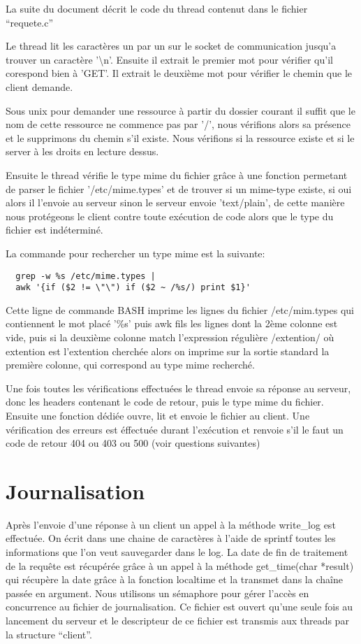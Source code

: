 \documentclass{article}
\begin{document}
La suite du document décrit le code du thread contenut dans le fichier ``requete.c''

Le thread lit les caractères un par un sur le socket de communication jusqu'a trouver un caractère '\textbackslash{}n'.
Ensuite il extrait le premier mot pour vérifier qu'il corespond bien à 'GET'.
Il extrait le deuxième mot pour vérifier le chemin que le client demande.

Sous unix pour demander une ressource à partir du dossier courant il suffit que le nom de cette ressource ne commence pas par '/', nous vérifions alors sa présence et le
supprimons du chemin s'il existe. Nous vérifions si la ressource existe et si le server à les droits en lecture dessus.\hbox{}

Ensuite le thread vérifie le type mime du fichier grâce à une fonction permetant de parser le fichier '/etc/mime.types' et de trouver si un mime-type existe, si oui alors
il l'envoie au serveur sinon le serveur envoie 'text/plain', de cette manière nous protégeons le client contre toute exécution de code alors que le type du fichier est indéterminé.\hbox{}

La commande pour rechercher un type mime est la suivante: \hbox{}
\begin{lstlisting}
  grep -w %s /etc/mime.types |
  awk '{if ($2 != \"\") if ($2 ~ /%s/) print $1}'
\end{lstlisting}

Cette ligne de commande BASH imprime les lignes du fichier /etc/mim.types qui contiennent le mot placé '\%s' puis awk fils les lignes dont la 2ème colonne est vide, puis si la deuxième colonne match l'expression régulière /extention/ où extention est l'extention cherchée alors on imprime sur la sortie standard la première colonne, qui correspond au type mime recherché.\hbox{}

Une fois toutes les vérifications effectuées le thread envoie sa réponse au serveur, donc les headers contenant le code de retour, puis le type mime du fichier.
Ensuite une fonction dédiée ouvre, lit et envoie le fichier au client.
\hbox{}
Une vérification des erreurs est éffectuée durant l'exécution et renvoie s'il le faut un code de retour 404 ou 403 ou 500 (voir questions suivantes)

\section{Journalisation}

Après l'envoie d'une réponse à un client un appel à la méthode write\_log est effectuée.
On écrit dans une chaine de caractères à l'aide de sprintf toutes les informations que l'on veut sauvegarder dans le log. La date de fin de traitement de la requête est récupérée grâce à un appel
à la méthode get\_time(char *result) qui récupère la date grâce à la fonction localtime et la transmet dans la chaîne passée en argument.\hbox{}
Nous utilisons un sémaphore pour gérer l'accès en concurrence au fichier de journalisation. Ce fichier est ouvert qu'une seule fois au lancement du serveur et le descripteur de ce fichier est transmis
aux threads par la structure ``client''.
\end{document}
